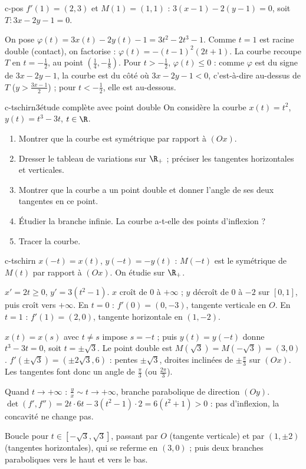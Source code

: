 \begin{corrige}{c-pos}
 $f'(1)=(2,3)$ et $M(1)=(1,1)$ : $3(x-1)-2(y-1)=0$, soit $T:3x-2y-1=0$.

 On pose $\varphi(t)=3x(t)-2y(t)-1=3t^2-2t^3-1$. Comme $t=1$ est racine double (contact), on factorise : $\varphi(t)=-(t-1)^2(2t+1)$. La courbe recoupe $T$ en $t=-\frac12$, au point $\left(\frac14,-\frac18\right)$. Pour $t>-\frac12$, $\varphi(t)\leq0$ : comme $\varphi$ est du signe de $3x-2y-1$, la courbe est du côté où $3x-2y-1<0$, c'est-à-dire au-dessus de $T$ ($y>\frac{3x-1}2$) ; pour $t<-\frac12$, elle est au-dessous.
\end{corrige}

\begin{exo}{c-tschirn}{3}{étude complète avec point double}
On considère la courbe $x(t)=t^2$, $y(t)=t^3-3t$, $t\in\R$.
\begin{enumerate}
\item Montrer que la courbe est symétrique par rapport à $(Ox)$.
\item Dresser le tableau de variations sur $\R_+$ ; préciser les tangentes horizontales et verticales.
\item Montrer que la courbe a un point double et donner l'angle de ses deux tangentes en ce point.
\item Étudier la branche infinie. La courbe a-t-elle des points d'inflexion ?
\item Tracer la courbe.
\end{enumerate}
\end{exo}

\begin{corrige}{c-tschirn}
 $x(-t)=x(t)$, $y(-t)=-y(t)$ : $M(-t)$ est le symétrique de $M(t)$ par rapport à $(Ox)$. On étudie sur $\R_+$.

 $x'=2t\geq0$, $y'=3(t^2-1)$. $x$ croît de $0$ à $+\infty$ ; $y$ décroît de $0$ à $-2$ sur $[0,1]$, puis croît vers $+\infty$. En $t=0$ : $f'(0)=(0,-3)$, tangente verticale en $O$. En $t=1$ : $f'(1)=(2,0)$, tangente horizontale en $(1,-2)$.

 $x(t)=x(s)$ avec $t\neq s$ impose $s=-t$ ; puis $y(t)=y(-t)$ donne $t^3-3t=0$, soit $t=\pm\sqrt3$. Le point double est $M(\sqrt3)=M(-\sqrt3)=(3,0)$. $f'(\pm\sqrt3)=(\pm2\sqrt3,6)$ : pentes $\pm\sqrt3$, droites inclinées de $\pm\frac\pi3$ sur $(Ox)$. Les tangentes font donc un angle de $\frac\pi3$ (ou $\frac{2\pi}3$).

 Quand $t\to+\infty$ : $\frac yx\sim t\to+\infty$, branche parabolique de direction $(Oy)$. $\det(f',f'')=2t\cdot6t-3(t^2-1)\cdot2=6(t^2+1)>0$ : pas d'inflexion, la concavité ne change pas.

 Boucle pour $t\in[-\sqrt3,\sqrt3]$, passant par $O$ (tangente verticale) et par $(1,\pm2)$ (tangentes horizontales), qui se referme en $(3,0)$ ; puis deux branches paraboliques vers le haut et vers le bas.
\end{corrige}

